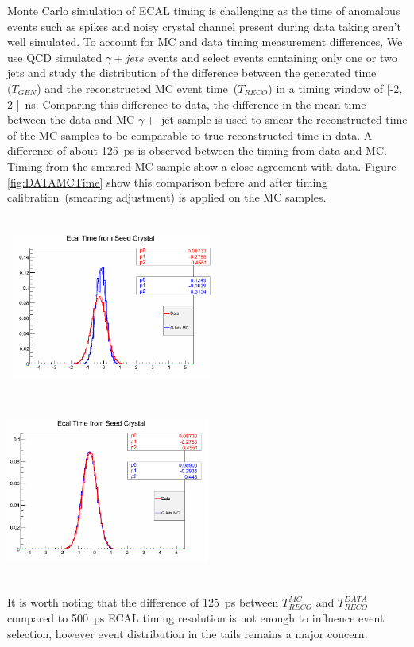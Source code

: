 Monte Carlo simulation of ECAL timing is challenging  as the time of anomalous events such as spikes and noisy crystal channel  present during data taking 
aren't well simulated.  To account for MC and data timing measurement differences, 
We use QCD simulated $\gamma + jets$ events and select events containing only one or two jets and study the distribution of the difference between the generated time~$(T_{GEN}$) and the reconstructed MC event time~($T_{RECO}$) in a timing window of [-2, 2 ]~ns. Comparing this difference to data, the difference in the mean time between the data and MC $\gamma +$ jet sample is used to smear the reconstructed time of the MC samples to be comparable to true reconstructed time in data. A difference of about 125~ps is observed between the timing from data and MC.  Timing from the smeared MC sample show a close agreement with data.
Figure \ref{fig:DATAMCTime} show this comparison before and after timing calibration~(smearing adjustment) is applied on the MC samples.

\begin{center}
\centering
\mbox{
\includegraphics[height=6cm, width=0.5\textwidth]{THESISPLOTS/MC_Vs_DataTimeB4Calib.png}
\includegraphics[height=6cm, width=0.5\textwidth]{THESISPLOTS/MC_Vs_DataTimeAferCalib.png}
}
\label{fig:DATAMCTime}
\end{center}
It is worth noting that the difference of 125~ps between $T^{MC}_{RECO}$ and $T^{DATA}_{RECO}$ compared to 500~ps ECAL timing resolution is not enough to influence event selection, however event distribution in the tails remains a major concern.
